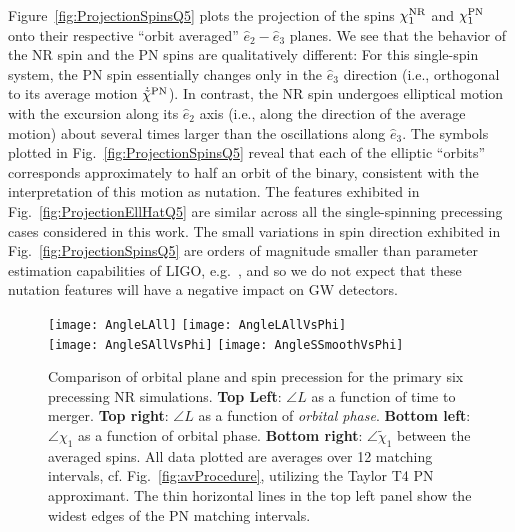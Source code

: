\documentclass[aps,prd,amsmath,floatfix,twocolumn,superscriptaddress,nofootinbib,showpacs]{revtex4-1}
\begin{document}
Figure~\ref{fig:ProjectionSpinsQ5} plots the projection of the spins
$\chi_1^{\rm NR}$ and $\chi_1^{\rm PN}$ onto their respective ``orbit
averaged'' $\hat{e}_{2}-\hat{e}_{3}$ planes.  We see that the behavior
of the NR spin and the PN spins are qualitatively different: For this
single-spin system, the PN spin essentially changes only in the
$\hat{e}_3$ direction (i.e., orthogonal to its average motion
$\dot{\tilde{\chi}}^{\rm PN}$).  In contrast, the NR spin undergoes
elliptical motion with the excursion along its $\hat e_2$ axis (i.e.,
along the direction of the average motion) about several times larger
than the oscillations along $\hat e_{3}$.  The symbols plotted in
Fig.~\ref{fig:ProjectionSpinsQ5} reveal that each of the elliptic
``orbits'' corresponds approximately to half an orbit of the binary,
consistent with the interpretation of this motion as nutation.  The
features exhibited in Fig.~\ref{fig:ProjectionEllHatQ5} are similar
across all the single-spinning precessing cases considered in this
work.  The small variations in spin direction exhibited in
Fig.~\ref{fig:ProjectionSpinsQ5} are orders of magnitude smaller than
parameter estimation capabilities of LIGO, e.g.~\cite{Veitch:2014wba},
and so we do not expect that these nutation features will have a
negative impact on GW detectors.

\begin{figure*}
  \texttt{[image: AngleLAll]} \hfill
  \texttt{[image: AngleLAllVsPhi]} \\[0.2cm]
  \texttt{[image: AngleSAllVsPhi]} \hfill
  \texttt{[image: AngleSSmoothVsPhi]}
  \caption{ \label{fig:AngleLAll} Comparison of orbital plane and spin
    precession for the primary six precessing NR simulations.  {\bf
      Top Left}: $\angle L$ as a function of time to merger.  {\bf Top
      right}: $\angle L$ as a function of \emph{orbital phase}.  {\bf
      Bottom left}: $\angle \chi_{1}$ as a function of orbital
    phase. {\bf Bottom right}: $\angle \tilde{\chi}_{1}$ between the
    averaged spins.  All data plotted are averages over 12 matching
    intervals, cf. Fig.~\ref{fig:avProcedure}, utilizing the Taylor T4
    PN approximant. The thin horizontal lines in the top left panel
    show the widest edges of the PN matching intervals.}
\end{figure*}
\end{document}
